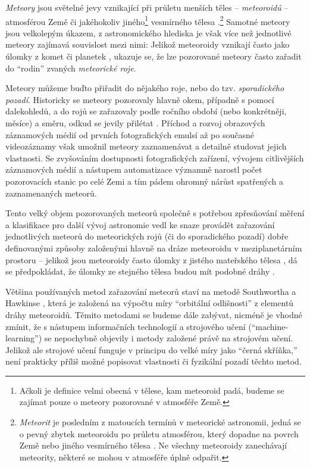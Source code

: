 
\textit{Meteory} jsou světelné jevy vznikající při průletu menších těles -- \textit{meteoroidů} -- atmosférou Země či jakéhokoliv jiného\footnote{Ačkoli je definice \cite{meteorastro} velmi obecná v tělese, kam meteoroid padá, budeme se zajímat pouze o meteory pozorované v atmosféře Země.} vesmírného tělesa \cite{meteorastro}.\footnote{\textit{Meteorit} je posledním z matoucích termínů v meteorické astronomii, jedná se o pevný zbytek meteoroidu po průletu atmosférou, který dopadne na povrch Země nebo jiného vesmírného tělesa \cite{meteorastro}. Ne všechny meteoroidy zanechávají meteority, některé se mohou v atmosféře úplně odpařit.} Samotné meteory jsou velkolepým úkazem, z astronomického hlediska je však více než jednotlivé meteory zajímavá souvislost mezi nimi: Jelikož meteoroidy vznikají často jako úlomky z komet či planetek \cite{meteorastro}\cite{cometassoc}, ukazuje se, že lze pozorované meteory často zařadit do "`rodin"' zvaných \textit{meteorické roje}.

Meteory můžeme buďto přiřadit do nějakého roje, nebo do tzv. \textit{sporadického pozadí}. Historicky se meteory pozorovaly hlavně okem, případně s pomocí dalekohledů, a do rojů se zařazovaly podle ročního období (nebo konkrétněji, měsíce) a směru, odkud se jevily přilétat \cite{radiosurvey}. Příchod a rozvoj obrazových záznamových médií od prvních fotografických emulsí až po současné videozáznamy však umožnil meteory zaznamenávat a detailně studovat jejich vlastnosti. Se zvyšováním dostupnosti fotografických zařízení, vývojem citlivějších záznamových médií a nástupem automatizace významně narostl počet pozorovacích stanic po celé Zemi a tím pádem ohromný nárůst spatřených a zaznamenaných meteorů.

Tento velký objem pozorovaných meteorů společně s potřebou zpřesňování měření a klasifikace pro další vývoj astronomie vedl ke snaze provádět zařazování jednotlivých meteorů do meteorických rojů (či do sporadického pozadí) dobře definovanými způsoby založenými hlavně na dráze meteoroidu \cite{dsh} v meziplanetárním prostoru -- jelikož jsou meteoroidy často úlomky z jistého mateřského tělesa \cite{meteorastro}\cite{cometassoc}, dá se předpokládat, že úlomky ze stejného tělesa budou mít podobné dráhy \cite{dsh}.

Většina používaných metod zařazování meteorů staví na metodě Southwortha a Hawkinse \cite{dsh}, která je založená na výpočtu míry "`orbitální odlišnosti"' z elementů dráhy meteoroidů. Těmito metodami se budeme dále zabývat, nicméně je vhodné zmínit, že s nástupem informačních technologií a strojového učení ("`machine-learning"') se nepochybně objevily i metody založené právě na strojovém učení. Jelikož ale strojové učení funguje v principu do velké míry jako "`černá skříňka,"' není prakticky příliš možné popisovat vlastnosti či fyzikální pozadí těchto metod.

